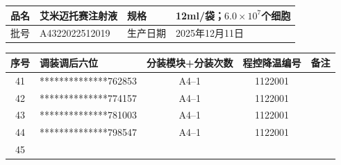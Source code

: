 \documentclass[UTF8,10pt,a4paper,fontset=fandol]{ctexart}
\newcommand{\fieldvalue}[1]{#1}
\begin{document}
\begin{center}
\begin{tabular}{|p{2.2cm}|p{5.0cm}|p{1.3cm}|p{4.2cm}|}
\hline
品名 &
\fieldvalue{艾米迈托赛注射液} &
规格 &
\fieldvalue{12ml/袋；$6.0\times10^{7}$个细胞}
\\ \hline
批号 &
\fieldvalue{A4322022512019} &
生产日期 &
\fieldvalue{2025年12月11日}
\\ \hline
\end{tabular}

\vspace{0.2em}

\small
\begin{tabular}{|c|p{4.2cm}|c|c|p{2.0cm}|}
\hline
序号 & 调装调后六位 & 分装模块+分装次数 & 程控降温编号 & 备注 \\ \hline
\fieldvalue{41} &
\fieldvalue{**************762853} &
\fieldvalue{A4--1} &
\fieldvalue{1122001} & \\ \hline
\fieldvalue{42} &
\fieldvalue{**************774157} &
\fieldvalue{A4--1} &
\fieldvalue{1122001} & \\ \hline
\fieldvalue{43} &
\fieldvalue{**************781003} &
\fieldvalue{A4--1} &
\fieldvalue{1122001} & \\ \hline
\fieldvalue{44} &
\fieldvalue{**************798547} &
\fieldvalue{A4--1} &
\fieldvalue{1122001} & \\ \hline
\fieldvalue{45} &

\end{tabular}
\end{center}
\end{document}
